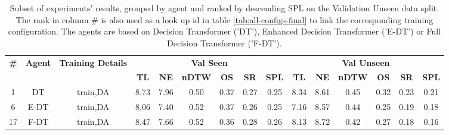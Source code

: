 \begin{table}
\centering
\caption{\label{tab:dagger}Subset of experiments' results, grouped by agent and ranked by descending SPL on the Validation Unseen data split. The rank in column \# is also used as a look up id in table \ref{tab:all-configs-final} to link the corresponding training configuration.     \newline The agents are based on Decision Transformer ('DT'), Enhanced Decision Transformer ('E-DT') or Full Decision Transformer ('F-DT').}
\begin{tabular}{@{\hskip3pt}c@{\hskip3pt}c@{\hskip3pt}c@{\hskip3pt}c@{\hskip3pt}c@{\hskip3pt}c@{\hskip3pt}c@{\hskip3pt}c@{\hskip3pt}c@{\hskip3pt}c@{\hskip3pt}c@{\hskip3pt}c@{\hskip3pt}c@{\hskip3pt}c@{\hskip3pt}c}
\toprule
\textbf{\#} & \textbf{Agent} & \textbf{Training Details} & \multicolumn{6}{c}{\textbf{Val Seen}} & \multicolumn{6}{c}{\textbf{Val Unseen}} \\
 \textbf{~} &     \textbf{~} &                \textbf{~} &       \textbf{TL} & \textbf{NE} & \textbf{nDTW} & \textbf{OS} & \textbf{SR} & \textbf{SPL} &         \textbf{TL} & \textbf{NE} & \textbf{nDTW} & \textbf{OS} & \textbf{SR} & \textbf{SPL} \\
\midrule
          1 &             DT &                  train,DA &              8.73 &        7.96 &          0.50 &        0.37 &        0.27 &         0.25 &                8.34 &        8.61 &          0.45 &        0.32 &        0.23 &         0.21 \\
          6 &           E-DT &                  train,DA &              8.06 &        7.40 &          0.52 &        0.37 &        0.26 &         0.25 &                7.16 &        8.57 &          0.44 &        0.25 &        0.19 &         0.18 \\
         17 &           F-DT &                  train,DA &              8.47 &        7.66 &          0.52 &        0.36 &        0.28 &         0.26 &                8.13 &        8.72 &          0.42 &        0.27 &        0.18 &         0.16 \\
\bottomrule
\end{tabular}
\end{table}
